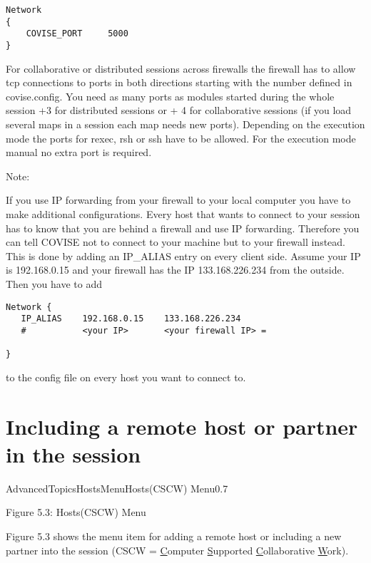 \begin{verbatim}
Network
{
    COVISE_PORT     5000
}
\end{verbatim}

For collaborative or distributed sessions across firewalls the firewall has to allow 
tcp connections to ports in both directions starting with the number defined in 
covise.config. You need as many ports as modules started during the whole session +3 
for distributed sessions or + 4 for collaborative sessions (if you load several maps 
in a session each map needs new ports). Depending on the execution mode the ports for 
rexec, rsh or ssh have to be allowed. For the execution mode manual no extra port 
is required.

Note:

If you use IP forwarding from your firewall to your local computer you
have to make additional configurations.
Every host that wants to connect to your session has to know that you
are behind a firewall and use IP forwarding.
Therefore you can tell COVISE not to connect to your machine but to your
firewall instead. This is done by adding an IP\_ALIAS entry on every client side. 
Assume your IP is 192.168.0.15 and your firewall has the IP 133.168.226.234 
from the outside. Then you have to add

\begin{verbatim}
Network {
   IP_ALIAS    192.168.0.15    133.168.226.234
   #           <your IP>       <your firewall IP> =

}
\end{verbatim}

to the config file on every host you want to connect to.


\section{Including a remote host or partner in the session}

\begin{covimg}{AdvancedTopics}{HostsMenu}{Hosts(CSCW) Menu}{0.7}\end{covimg}
\begin{htmlonly}
Figure 5.3: Hosts(CSCW) Menu
\vspace{0.5cm}
\end{htmlonly}

Figure 5.3 shows the menu item for adding a remote host or including a new partner 
into the session (CSCW = \underline{C}omputer \underline{S}upported \underline{C}ollaborative 
\underline{W}ork).


